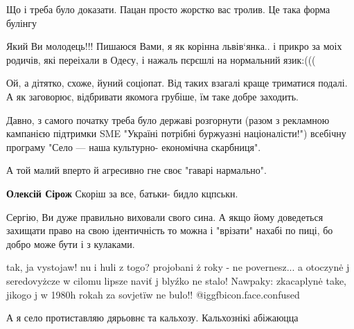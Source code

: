 \begin{itemize}
Що і треба було доказати. Пацан просто жорстко вас тролив. Це така форма булінгу


Який Ви молодець!!! Пишаюся Вами, я як корінна львів‘янка.. і прикро за моіх
родичів, які переіхали в Одесу, і нажаль пєрєшлі на нормальний язик:(((



Ой, а дітятко, схоже, йуний соціопат. Від таких взагалі краще триматися подалі.
А як заговорює, відбривати якомога грубіше, їм таке добре заходить.



Давно, з самого початку треба було державі розгорнути (разом з рекламною
кампанією підтримки SME "Україні потрібні буржуазні націоналісти!") всебічну
програму "Село — наша культурно- економічна скарбниця".

А той малий вперто й агресивно гне своє "гаварі нармально".

\textbf{Олексій Сірож} Скоріш за все, батьки- бидло кцпськн.


Сергію, Ви дуже правильно виховали свого сина. А якщо йому доведеться захищати
право на свою ідентичність то можна і "врізати" нахабі по пиці, бо добро може
бути і з кулаками.


tak, ja vystojaw!
nu i huli z togo?
projobani ż roky - ne povernesz...
a otoczynė j seredovyżcze w cilomu lipsze naviť j blyźko ne stalo! Nawpaky: zkacaplynė take, jikogo j w 1980h rokah za sovjetïw ne bulo!!  @igg{fbicon.face.confused} 


А я село протиставляю дярьовнє та кальхозу. Кальхознікі абіжаюцца

\end{itemize} %
